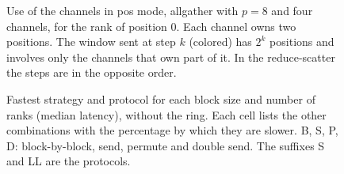 \begin{figure}[htbp]
\centering
{}
\caption{Use of the channels in pos mode, allgather with $p=8$ and four channels, for the rank of position $0$. Each channel owns two positions. The window sent at step $k$ (colored) has $2^k$ positions and involves only the channels that own part of it. In the reduce-scatter the steps are in the opposite order.}
\label{fig:bfly-posuse}
\end{figure}

\begin{figure}[!tbp]
  \caption{Fastest \bine{} strategy and protocol for each block size and number of ranks (median latency), without the ring. Each cell lists the other combinations with the percentage by which they are slower. B, S, P, D: block-by-block, send, permute and double send. The suffixes S and LL are the protocols.}
  \label{fig:bfly-modes}
\end{figure}

